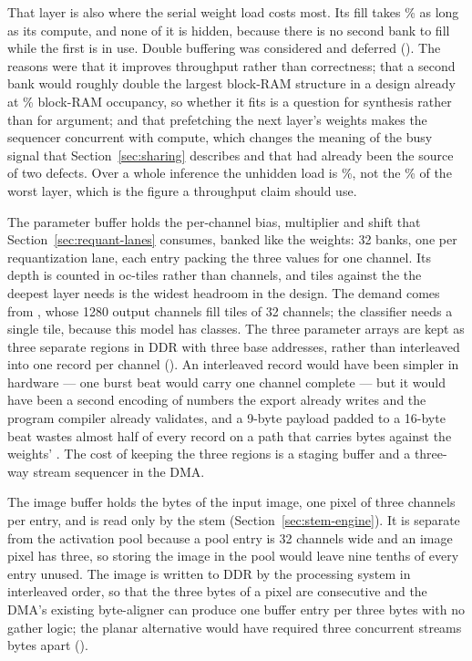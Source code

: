 That layer is also where the serial weight load costs most. Its fill takes
\thWgtWorstOverheadPct\% as long as its compute, and none of it is hidden,
because there is no second bank to fill while the first is in use. Double
buffering was considered and deferred (). The reasons were that it
improves throughput rather than correctness; that a second bank would roughly
double the largest block-RAM structure in a design already at
\thBramPctBoard\% block-RAM occupancy, so whether it fits is a question for
synthesis rather than for argument; and that prefetching the next layer's
weights makes the sequencer concurrent with compute, which changes the meaning
of the busy signal that Section~\ref{sec:sharing} describes and that had
already been the source of two defects. Over a whole inference the unhidden
load is \thLoadOverheadPct\%, not the \thWgtWorstOverheadPct\% of the worst
layer, which is the figure a throughput claim should use.

The parameter buffer holds the per-channel bias, multiplier and shift that
Section~\ref{sec:requant-lanes} consumes, banked like the weights: 32 banks,
one per requantization lane, each entry packing the three values for one
channel. Its depth is counted in oc-tiles rather than channels, and
\thParamDepth{} tiles against the \thParamEntries{} the deepest layer needs is
the widest headroom in the design. The demand comes from
, whose 1280 output channels fill \thParamEntries{} tiles
of 32 channels; the classifier needs a single tile, because this model has
\thClasses{} classes. The three
parameter arrays are kept as three separate regions in DDR with three base
addresses, rather than interleaved into one record per channel (). An
interleaved record would have been simpler in hardware --- one burst beat would
carry one channel complete --- but it would have been a second encoding of
numbers the export already writes and the program compiler already validates,
and a 9-byte payload padded to a 16-byte beat wastes almost half of every
record on a path that carries \thParamBlobBytes{} bytes against the weights'
\thWeightBytes. The cost of keeping the three regions is a staging buffer and a
three-way stream sequencer in the DMA.

The image buffer holds the \thImgBytes{} bytes of the input image, one pixel of
three channels per entry, and is read only by the stem
(Section~\ref{sec:stem-engine}). It is separate from the activation pool
because a pool entry is 32 channels wide and an image pixel has three, so
storing the image in the pool would leave nine tenths of every entry unused.
The image is written to DDR by the processing system in interleaved order, so
that the three bytes of a pixel are consecutive and the DMA's existing
byte-aligner can produce one buffer entry per three bytes with no gather logic;
the planar alternative would have required three concurrent streams
\thImgBytes{} bytes apart ().

